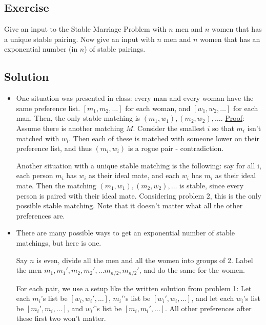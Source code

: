\documentclass{article}
\newcounter{counter}
\newcommand{\Exercise}{Exercise \stepcounter{counter}\thecounter}
\begin{document}
\subsection*{\Exercise}
    Give an input to the Stable Marriage Problem with $n$ men and $n$ women that has a unique stable pairing.   Now give an input with $n$ men and $n$ women that has an exponential number (in $n$) of stable pairings.

\subsection*{Solution}
    \begin{itemize}
      \item One situation was presented in class: every man and every woman have
        the same preference list. $[m_1,m_2,\ldots]$ for each woman, and
        $[w_1,w_2,\ldots]$ for each man. Then, the only stable matching is
        $(m_1,w_1), (m_2,w_2),\ldots$. \underline{Proof}: Assume there is another matching $M$.
        Consider the smallest $i$ so that $m_i$ isn't matched with $w_i$.
        Then each of these is matched with someone lower on their preference list, and thus $(m_i,w_i)$ is
        a rogue pair - contradiction.
    
        Another situation with a unique stable matching is the following:
        say for all i, each person $m_i$ has
        $w_i$ as their ideal mate, and each $w_i$ has $m_i$ as their ideal mate.
        Then the matching $(m_1,w_1), (m_2,w_2),\ldots$ is stable, since every
        person is paired with their ideal mate. Considering problem $2$, this is
        the only possible stable matching. Note that it doesn't matter what
        all the other preferences are.
    
      \item There are many possible ways to get an exponential number of stable
        matchings, but here is one.
    
        Say $n$ is even, divide all the men and all the women into groups of 2.
        Label the men $m_1,m_1', m_2,m_2',\ldots m_{n/2},m_{n/2}'$, and do the
        same for the women.
    
        For each pair, we use a setup like the written solution from problem 1:
        Let each $m_i$'s list be $[w_i,w_i',\ldots]$, $m_i'$'s list be
        $[w_i',w_i,\ldots]$, and let each
        $w_i$'s list be $[m_i',m_i,\ldots]$, and $w_i'$'s list be
        $[m_i,m_i',\ldots]$. All other preferences after these first two won't
        matter.
    

\end{itemize}
\end{document}

